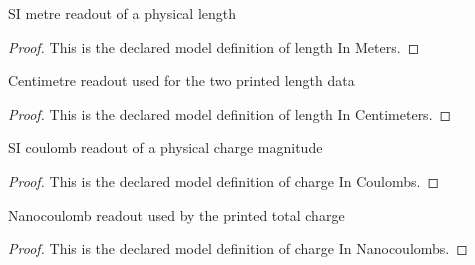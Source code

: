 \begin{definition}
  \label{def:physics:phyx-mini-0835:phyxminiproblems-problemphyxmini0835-lengthinmeters}
  SI metre readout of a physical length
\end{definition}
\begin{proof}
  This is the declared model definition of length In Meters.
\end{proof}
\begin{definition}
  \label{def:physics:phyx-mini-0835:phyxminiproblems-problemphyxmini0835-lengthincentimeters}
  Centimetre readout used for the two printed length data
\end{definition}
\begin{proof}
  This is the declared model definition of length In Centimeters.
\end{proof}
\begin{definition}
  \label{def:physics:phyx-mini-0835:phyxminiproblems-problemphyxmini0835-chargeincoulombs}
  SI coulomb readout of a physical charge magnitude
\end{definition}
\begin{proof}
  This is the declared model definition of charge In Coulombs.
\end{proof}
\begin{definition}
  \label{def:physics:phyx-mini-0835:phyxminiproblems-problemphyxmini0835-chargeinnanocoulombs}
  Nanocoulomb readout used by the printed total charge
\end{definition}
\begin{proof}
  This is the declared model definition of charge In Nanocoulombs.
\end{proof}
